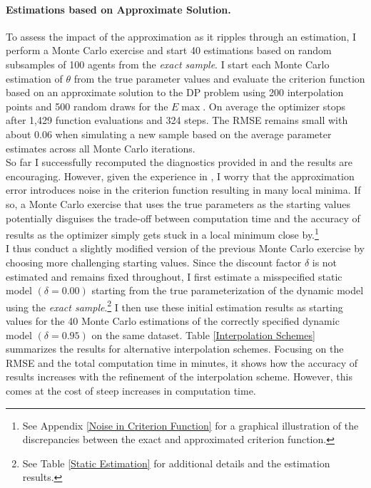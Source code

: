 \paragraph{Estimations based on Approximate Solution.}
To assess the impact of the approximation as it ripples through an estimation, I perform a Monte Carlo exercise and start 40 estimations based on random subsamples of 100 agents from the \textit{exact sample}. I start each Monte Carlo estimation of $\theta$ from the true parameter values and evaluate the criterion function based on an approximate solution to the DP problem using 200 interpolation points and 500 random draws for the $E\max$. On average the optimizer stops after 1,429 function evaluations and 324 steps. The RMSE remains small with about 0.06 when simulating a new sample based on the average parameter estimates across all Monte Carlo iterations. \\\newline
%
So far I successfully recomputed the diagnostics provided in \citet{Keane.1994} and the results are encouraging. However, given the experience in \citet{Eisenhauer.2015b}, I worry that the approximation error introduces noise in the criterion function resulting in many local minima. If so, a Monte Carlo exercise that uses the true parameters as the starting values potentially disguises the trade-off between computation time and the accuracy of results as the optimizer simply gets stuck in a local minimum close by.\footnote{See Appendix \ref{Noise in Criterion Function} for a graphical illustration of the discrepancies between the exact and approximated criterion function.}\\\newline
%
I thus conduct a slightly modified version of the previous Monte Carlo exercise by choosing more challenging starting values. Since the discount factor $\delta$ is not estimated and remains fixed throughout, I first estimate a misspecified static model $(\delta = 0.00)$ starting from the true parameterization of the dynamic model using the \textit{exact sample}.\footnote{See Table \ref{Static Estimation} for additional details and the estimation results.} I then use these initial estimation results as starting values for the 40 Monte Carlo estimations of the correctly specified dynamic model $(\delta = 0.95)$ on the same dataset. Table \ref{Interpolation Schemes} summarizes the results for alternative interpolation schemes. Focusing on the RMSE and the total computation time in minutes, it shows how the accuracy of results increases with the refinement of the interpolation scheme. However, this comes at the cost of steep increases in computation time.

